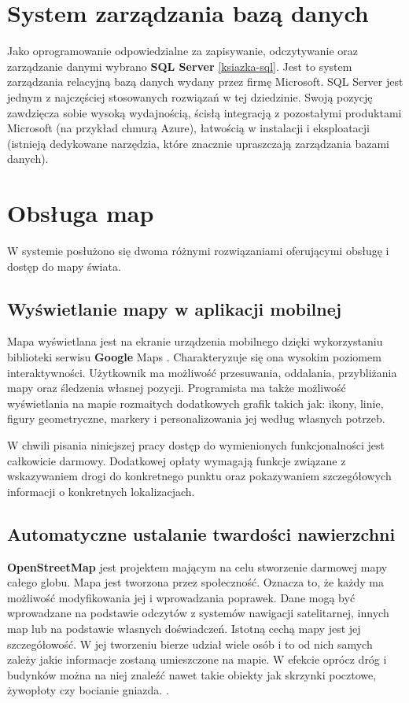 \section{System zarządzania bazą danych}
Jako oprogramowanie odpowiedzialne za zapisywanie, odczytywanie oraz zarządzanie danymi wybrano \textbf{SQL Server} \ref{ksiazka-sql}. Jest to system zarządzania relacyjną bazą danych wydany przez firmę Microsoft. SQL Server jest jednym z najczęściej stosowanych rozwiązań w tej dziedzinie. Swoją pozycję zawdzięcza sobie wysoką wydajnością, ścisłą integracją z pozostałymi produktami Microsoft (na przykład chmurą Azure), łatwością w instalacji i eksploatacji (istnieją dedykowane narzędzia, które znacznie upraszczają zarządzania bazami danych).

\section{Obsługa map}
W systemie posłużono się dwoma różnymi rozwiązaniami oferującymi obsługę i dostęp do mapy świata.
\subsection{Wyświetlanie mapy w aplikacji mobilnej}
Mapa wyświetlana jest na ekranie urządzenia mobilnego dzięki wykorzystaniu biblioteki serwisu \textbf{Google} Maps \cite{google-maps}. Charakteryzuje się ona wysokim poziomem interaktywności. Użytkownik ma możliwość przesuwania, oddalania, przybliżania mapy oraz śledzenia własnej pozycji. Programista ma także możliwość wyświetlania na mapie rozmaitych dodatkowych grafik takich jak: ikony, linie, figury geometryczne, markery i personalizowania jej według własnych potrzeb.

W chwili pisania niniejszej pracy dostęp do wymienionych funkcjonalności jest całkowicie darmowy. Dodatkowej opłaty wymagają funkcje związane z wskazywaniem drogi do konkretnego punktu oraz pokazywaniem szczegółowych informacji o konkretnych lokalizacjach.
\subsection{Automatyczne ustalanie twardości nawierzchni}
\textbf{OpenStreetMap} \cite{osm} jest projektem mającym na celu stworzenie darmowej mapy całego globu. Mapa jest tworzona przez społeczność. Oznacza to, że każdy ma możliwość modyfikowania jej i wprowadzania poprawek. Dane mogą być wprowadzane na podstawie odczytów z systemów nawigacji satelitarnej, innych map lub na podstawie własnych doświadczeń. Istotną cechą mapy jest jej szczegółowość. W jej tworzeniu bierze udział wiele osób i to od nich samych zależy jakie informacje zostaną umieszczone na mapie. W efekcie oprócz dróg i budynków można na niej znaleźć nawet takie obiekty jak skrzynki pocztowe, żywopłoty czy bocianie gniazda. \cite{osm-gather-data}. 

